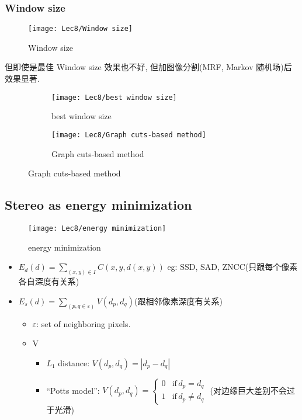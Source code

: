 \subsubsection{Window size}
\begin{figure}[H]
    \centering
    \texttt{[image: Lec8/Window size]}
    \caption{Window size}
\end{figure}

但即使是最佳 Window size 效果也不好, 但加图像分割(MRF, Markov 随机场)后效果显著. 

\begin{figure}[H]
    \centering
    \begin{subfigure}{0.28\textwidth}
        \centering
        \texttt{[image: Lec8/best window size]}
        \caption{best window size}
    \end{subfigure}
    \begin{subfigure}{0.28\textwidth}
        \centering
        \texttt{[image: Lec8/Graph cuts-based method]}
        \caption{Graph cuts-based method}
    \end{subfigure}
\end{figure}

\subsection{Stereo as energy minimization}
\begin{figure}[H]
    \centering
    \texttt{[image: Lec8/energy minimization]}
    \caption{energy minimization}
\end{figure}

\begin{itemize}
    \item $E_d(d)=\sum_{(x,y)\in I}C\left(x,y,d(x,y)\right)$ eg: SSD, SAD, ZNCC(只跟每个像素各自深度有关系)
    \item $E_s(d)=\sum_{(p,q\in \varepsilon)}V(d_p,d_q)$(跟相邻像素深度有关系)
    \begin{itemize}
        \item $\varepsilon$: set of neighboring pixels.
        \item V
        \begin{itemize}
            \item $L_1$ distance: $V(d_p,d_q)=\left| d_p-d_q \right|$
            \item ``Potts model'': $V(d_p,d_q)=\left\{ \begin{array}{cc}
                0 & \text{if}\,d_p=d_q\\
                1 & \text{if}\,d_p\ne d_q
            \end{array} \right.$ (对边缘巨大差别不会过于光滑)
        \end{itemize}
    \end{itemize}
\end{itemize}

